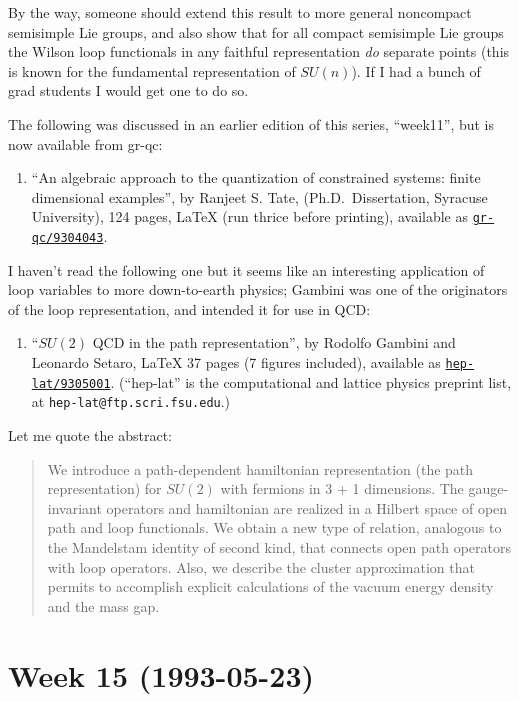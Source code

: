 \documentclass{article}
\def\tightlist{}
\begin{document}
By the way, someone should extend this result to more general noncompact
semisimple Lie groups, and also show that for all compact semisimple Lie
groups the Wilson loop functionals in any faithful representation
\emph{do} separate points (this is known for the fundamental
representation of \(SU(n)\)). If I had a bunch of grad students I would
get one to do so.

The following was discussed in an earlier edition of this series,
``week11'', but is now available from gr-qc:

\begin{enumerate}
\def\labelenumi{\arabic{enumi})}
\setcounter{enumi}{4}
\tightlist
\item
  ``An algebraic approach to the quantization of constrained systems:
  finite dimensional examples'', by Ranjeet S. Tate,
  (Ph.D.~Dissertation, Syracuse University), 124 pages, LaTeX (run
  thrice before printing), available as
  \href{http://xxx.lanl.gov/abs/gr-qc/9304043}{\texttt{gr-qc/9304043}}.
\end{enumerate}

I haven't read the following one but it seems like an interesting
application of loop variables to more down-to-earth physics; Gambini was
one of the originators of the loop representation, and intended it for
use in QCD:

\begin{enumerate}
\def\labelenumi{\arabic{enumi})}
\setcounter{enumi}{5}
\tightlist
\item
  ``\(SU(2)\) QCD in the path representation'', by Rodolfo Gambini and
  Leonardo Setaro, LaTeX 37 pages (7 figures included), available as
  \href{http://xxx.lanl.gov/abs/hep-lat/9305001}{\texttt{hep-lat/9305001}}.
  (``hep-lat'' is the computational and lattice physics preprint list,
  at \texttt{hep-lat@ftp.scri.fsu.edu}.)
\end{enumerate}

Let me quote the abstract:

\begin{quote}
We introduce a path-dependent hamiltonian representation (the path
representation) for \(SU(2)\) with fermions in 3 + 1 dimensions. The
gauge-invariant operators and hamiltonian are realized in a Hilbert
space of open path and loop functionals. We obtain a new type of
relation, analogous to the Mandelstam identity of second kind, that
connects open path operators with loop operators. Also, we describe the
cluster approximation that permits to accomplish explicit calculations
of the vacuum energy density and the mass gap.
\end{quote}
\hypertarget{week-15-1993-05-23}{%
\section{Week 15 (1993-05-23)}\label{week-15-1993-05-23}}
\end{document}
